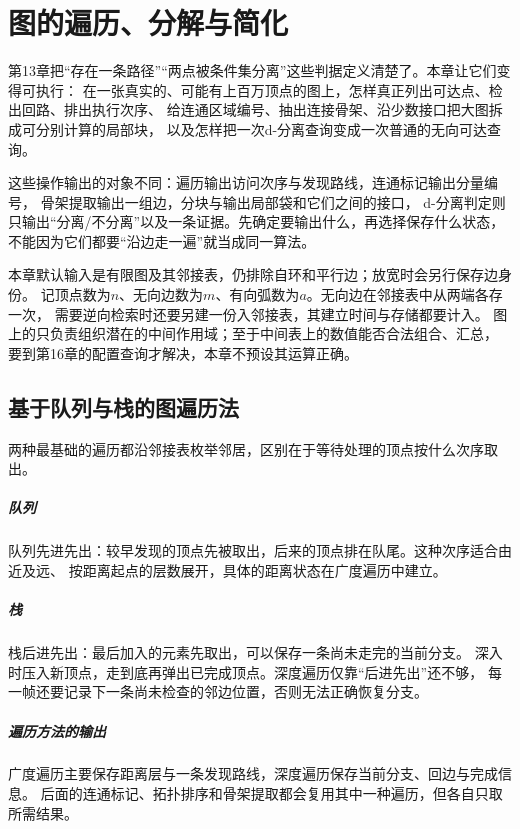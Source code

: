 \chapter{图的遍历、分解与简化}
\label{chap:graph-traversal}

第13章把“存在一条路径”“两点被条件集分离”这些判据定义清楚了。本章让它们变得可执行：
在一张真实的、可能有上百万顶点的图上，怎样真正列出可达点、检出回路、排出执行次序、
给连通区域编号、抽出连接骨架、沿少数接口把大图拆成可分别计算的局部块，
以及怎样把一次d-分离查询变成一次普通的无向可达查询。

这些操作输出的对象不同：遍历输出访问次序与发现路线，连通标记输出分量编号，
骨架提取输出一组边，分块与输出局部袋和它们之间的接口，
d-分离判定则只输出“分离/不分离”以及一条证据。先确定要输出什么，再选择保存什么状态，
不能因为它们都要“沿边走一遍”就当成同一算法。

本章默认输入是有限图及其邻接表，仍排除自环和平行边；放宽时会另行保存边身份。
记顶点数为$n$、无向边数为$m$、有向弧数为$a$。无向边在邻接表中从两端各存一次，
需要逆向检索时还要另建一份入邻接表，其建立时间与存储都要计入。
图上的只负责组织潜在的中间作用域；至于中间表上的数值能否合法组合、汇总，
要到第16章的配置查询才解决，本章不预设其运算正确。

\section{基于队列与栈的图遍历法}

两种最基础的遍历都沿邻接表枚举邻居，区别在于等待处理的顶点按什么次序取出。

\paragraph{队列}
队列先进先出：较早发现的顶点先被取出，后来的顶点排在队尾。这种次序适合由近及远、
按距离起点的层数展开，具体的距离状态在广度遍历中建立。

\paragraph{栈}
栈后进先出：最后加入的元素先取出，可以保存一条尚未走完的当前分支。
深入时压入新顶点，走到底再弹出已完成顶点。深度遍历仅靠“后进先出”还不够，
每一帧还要记录下一条尚未检查的邻边位置，否则无法正确恢复分支。

\paragraph{遍历方法的输出}
广度遍历主要保存距离层与一条发现路线，深度遍历保存当前分支、回边与完成信息。
后面的连通标记、拓扑排序和骨架提取都会复用其中一种遍历，但各自只取所需结果。

